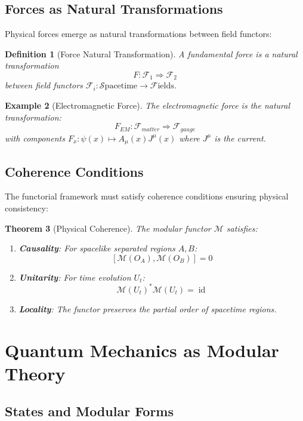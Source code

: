 \documentclass[12pt,a4paper]{article}
\newtheorem{theorem}{Theorem}[section]
\newtheorem{definition}[theorem]{Definition}
\newtheorem{example}[theorem]{Example}
\DeclareMathOperator{\id}{id}
\begin{document}
\subsection{Forces as Natural Transformations}

Physical forces emerge as natural transformations between field functors:

\begin{definition}[Force Natural Transformation]
A fundamental force is a natural transformation
\[
F: \mathcal{F}_1 \Rightarrow \mathcal{F}_2
\]
between field functors $\mathcal{F}_i: \mathcal{S}\text{pacetime} \to \mathcal{F}\text{ields}$.
\end{definition}

\begin{example}[Electromagnetic Force]
The electromagnetic force is the natural transformation:
\[
F_{EM}: \mathcal{F}_{matter} \Rightarrow \mathcal{F}_{gauge}
\]
with components $F_x: \psi(x) \mapsto A_\mu(x) J^\mu(x)$ where $J^\mu$ is the current.
\end{example}

\subsection{Coherence Conditions}

The functorial framework must satisfy coherence conditions ensuring physical consistency:

\begin{theorem}[Physical Coherence]
The modular functor $\mathcal{M}$ satisfies:
\begin{enumerate}
\item \textbf{Causality}: For spacelike separated regions $A, B$:
\[
[\mathcal{M}(O_A), \mathcal{M}(O_B)] = 0
\]

\item \textbf{Unitarity}: For time evolution $U_t$:
\[
\mathcal{M}(U_t)^* \mathcal{M}(U_t) = \id
\]

\item \textbf{Locality}: The functor preserves the partial order of spacetime regions.
\end{enumerate}
\end{theorem}

\section{Quantum Mechanics as Modular Theory}

\subsection{States and Modular Forms}
\end{document}
